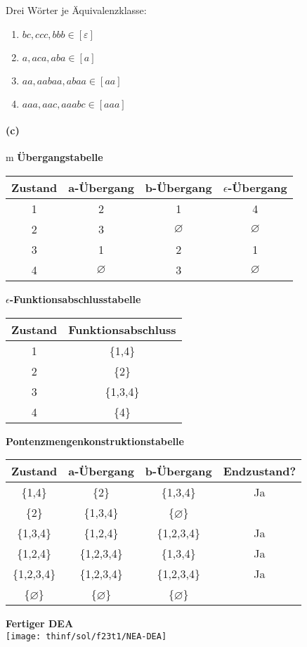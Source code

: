	Drei Wörter je Äquivalenzklasse:
	\begin{enumerate}
		\item $bc, ccc, bbb \in [\varepsilon]$
		\item $a, aca, aba \in [a]$
		\item $aa, aabaa, abaa \in [aa]$
		\item $aaa, aac, aaabc \in [aaa]$
	\end{enumerate}
	\vspace{0.3cm}
	
\paragraph{(c)}m 
	\textbf{Übergangstabelle}
	
	\begin{tabular}{|c|c|c|c|}
		\hline
		\textbf{Zustand}  & \textbf{a-Übergang} & \textbf{b-Übergang} & \textbf{$\epsilon$-Übergang} \\
		\hline
		1                 & 2                   & 1                   & 4 \\
		\hline
		2                 & 3                   & $\varnothing$       & $\varnothing$ \\
		\hline
		3                 & 1                   & 2                   & 1 \\
		\hline
		4                 & $\varnothing$       & 3                   & $\varnothing$ \\
		\hline
	\end{tabular}
	
	
	\textbf{$\epsilon$-Funktionsabschlusstabelle}
		
	\begin{tabular}{|c|c|}
		\hline
		\textbf{Zustand}  & \textbf{Funktionsabschluss} \\
		\hline
		1                 & \{1,4\} \\
		\hline
		2                 & \{2\} \\
		\hline
		3                 & \{1,3,4\}  \\
		\hline
		4                 & \{4\} \\
		\hline
	\end{tabular}
	
	\textbf{Pontenzmengenkonstruktionstabelle}
	
	\begin{tabular}{|c|c|c|c|}
		\hline
		\textbf{Zustand} & \textbf{a-Übergang} & \textbf{b-Übergang} & \textbf{Endzustand?} \\
		\hline
		\{1,4\}     & \{2\}       & \{1,3,4\}         & Ja \\
		\hline
		\{2\}       & \{1,3,4\}   & \{$\varnothing$\} &    \\
		\hline
		\{1,3,4\}   & \{1,2,4\}   & \{1,2,3,4\}       & Ja \\
		\hline
		\{1,2,4\}   & \{1,2,3,4\} & \{1,3,4\}         & Ja \\
		\hline
		\{1,2,3,4\} & \{1,2,3,4\} & \{1,2,3,4\}       & Ja \\
		\hline
		\{$\varnothing$\}       & \{$\varnothing$\}   & \{$\varnothing$\} &    \\
		\hline
	\end{tabular}	
	
	\textbf{Fertiger DEA} \\
	
	\texttt{[image: thinf/sol/f23t1/NEA-DEA]}
	


\newpage
